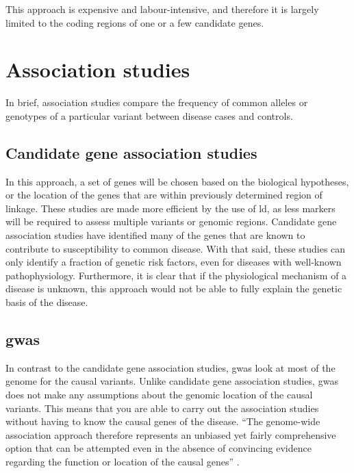 This approach is expensive and labour-intensive, and therefore it is largely limited to the coding regions of one or a few candidate genes.

\section{Association studies}
\label{sec:association_studies}

In brief, association studies compare the frequency of common alleles or genotypes of  a particular variant between disease cases and controls.

\subsection{Candidate gene association studies}
\label{sub:candidate_gene_association_studies}

In this approach, a set of genes will be chosen based on the biological hypotheses, or the location of the genes that are within previously determined region of linkage.
These studies are made more efficient by the use of \gls{ld}, as less markers will be required to assess multiple variants or genomic regions.
Candidate gene association studies have identified many of the genes that are known to contribute to susceptibility to common disease.
With that said, these studies can only identify  a fraction of genetic risk factors, even for diseases with well-known pathophysiology.
Furthermore, it is clear that if the physiological mechanism of a disease is unknown, this approach would not be able to fully explain the genetic basis of the disease.

\subsection{\Acrfull{gwas}}
\label{sub:gwas}

In contrast to the candidate gene association studies, \gls{gwas} look at most of the genome for the causal variants.
Unlike candidate gene association studies, \gls{gwas} does not make any assumptions about the genomic location of the causal variants.
This means that you are able to carry out the association studies without having to know the causal genes of the disease.
``The genome-wide association approach therefore represents an unbiased yet fairly comprehensive option that can be attempted even in the absence of convincing evidence regarding the function or location of the causal genes'' \citep{Hirschhorn2005}.


















